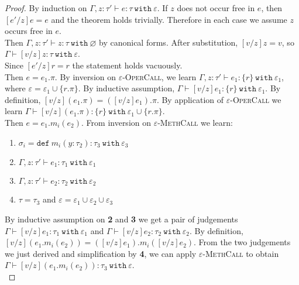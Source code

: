 \documentclass[a4paper,UKenglish]{lipics-v2016}
\newcommand{\kw}[1]{\mathtt{ #1 }~}
\newcommand{\kwa}[1]{\mathtt{ #1 }}
\begin{document}
\begin{proof}
By induction on $\Gamma, z: \tau' \vdash e: \tau~\kw{with} \varepsilon$. If $z$ does not occur free in $e$, then $[e'/z]e = e$ and the theorem holds trivially. Therefore in each case we assume $z$ occurs free in $e$. \\

\noindent
{} Then $\Gamma, z: \tau' \vdash z: \tau~\kw{with} \varnothing$ by canonical forms. After substitution, $[v/z]z = v$, so $\Gamma \vdash [v/z]z : \tau~\kw{with} \varepsilon$.\\

\noindent
{} Since $[e'/z]r = r$ the statement holds vacuously. \\


\noindent
{}
Then $e = e_1.\pi$. By inversion on \textsc{$\varepsilon$-OperCall}, we learn $\Gamma, z: \tau' \vdash e_1: \{ r \}~\kw{with} \varepsilon_1$, where $\varepsilon = \varepsilon_1 \cup \{ r.\pi \}$. By inductive assumption, $\Gamma \vdash [v/z]e_1: \{ r \}~\kw{with} \varepsilon_1$. By definition, $[v/z](e_1.\pi) = ([v/z]e_1).\pi$. By application of \textsc{$\varepsilon$-OperCall} we learn $\Gamma \vdash [v/z](e_1.\pi) : \{ r \} ~\kw{with} \varepsilon_1 \cup \{ r.\pi \}$.
\\

\noindent
{}
Then $e = e_1.m_i(e_2)$. From inversion on \textsc{$\varepsilon$-MethCall} we learn:

\begin{enumerate}
	\item $\sigma_i = \kwa{def}~m_i(y: \tau_2): \tau_3~\kw{with} \varepsilon_3$
	\item $\Gamma, z:\tau' \vdash e_1 : \tau_1~\kw{with} \varepsilon_1$
	\item $\Gamma, z:\tau' \vdash e_2: \tau_2~\kw{with} \varepsilon_2$
	\item $\tau = \tau_3$ and $\varepsilon = \varepsilon_1 \cup \varepsilon_2 \cup \varepsilon_3$
\end{enumerate}

\noindent
By inductive assumption on \textbf{2} and \textbf{3} we get a pair of judgements $\Gamma \vdash [v/z]e_1: \tau_1~\kw{with} \varepsilon_1$ and $\Gamma \vdash [v/z]e_2: \tau_2~\kw{with} \varepsilon_2$. By definition, $[v/z](e_1.m_i(e_2)) = ([v/z]e_1).m_i([v/z]e_2)$. From the two judgements we just derived and simplification by \textbf{4}, we can apply \textsc{$\varepsilon$-MethCall} to obtain $\Gamma \vdash [v/z](e_1.m_i(e_2)): \tau_3~\kw{with} \varepsilon$.
\\


\end{proof}
\end{document}
